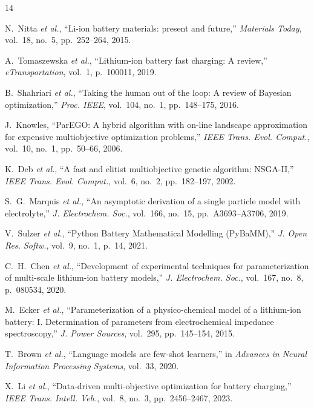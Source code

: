 \documentclass[journal]{IEEEtran}
\begin{document}
\begin{thebibliography}{14}

N.~Nitta \textit{et al.}, ``Li-ion battery materials: present and future,''
\textit{Materials Today}, vol.~18, no.~5, pp.~252--264, 2015.

A.~Tomaszewska \textit{et al.}, ``Lithium-ion battery fast charging: A review,''
\textit{eTransportation}, vol.~1, p.~100011, 2019.

B.~Shahriari \textit{et al.}, ``Taking the human out of the loop: A review of
Bayesian optimization,'' \textit{Proc. IEEE}, vol.~104, no.~1, pp.~148--175,
2016.

J.~Knowles, ``ParEGO: A hybrid algorithm with on-line landscape approximation
for expensive multiobjective optimization problems,'' \textit{IEEE Trans. Evol.
Comput.}, vol.~10, no.~1, pp.~50--66, 2006.

K.~Deb \textit{et al.}, ``A fast and elitist multiobjective genetic algorithm:
NSGA-II,'' \textit{IEEE Trans. Evol. Comput.}, vol.~6, no.~2, pp.~182--197,
2002.

S.~G.~Marquis \textit{et al.}, ``An asymptotic derivation of a single particle
model with electrolyte,'' \textit{J. Electrochem. Soc.}, vol.~166, no.~15,
pp.~A3693--A3706, 2019.

V.~Sulzer \textit{et al.}, ``Python Battery Mathematical Modelling (PyBaMM),''
\textit{J. Open Res. Softw.}, vol.~9, no.~1, p.~14, 2021.

C.~H.~Chen \textit{et al.}, ``Development of experimental techniques for
parameterization of multi-scale lithium-ion battery models,''
\textit{J. Electrochem. Soc.}, vol.~167, no.~8, p.~080534, 2020.

M.~Ecker \textit{et al.}, ``Parameterization of a physico-chemical model of a
lithium-ion battery: I. Determination of parameters from electrochemical
impedance spectroscopy,'' \textit{J. Power Sources}, vol.~295, pp.~145--154,
2015.

T.~Brown \textit{et al.}, ``Language models are few-shot learners,'' in
\textit{Advances in Neural Information Processing Systems}, vol.~33, 2020.

X.~Li \textit{et al.}, ``Data-driven multi-objective optimization for battery
charging,'' \textit{IEEE Trans. Intell. Veh.}, vol.~8, no.~3,
pp.~2456--2467, 2023.


\end{thebibliography}
\end{document}
